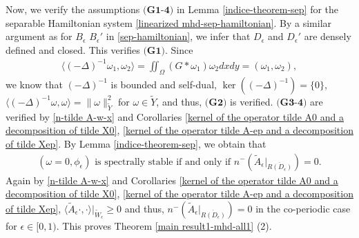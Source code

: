 \documentclass[1 [leqno, 11pt]{amsart}
\numberwithin{equation}{section}
\let\ep=\epsilon
\newtheorem{Theorem}{Theorem}[section]
\begin{document}
\begin{CJK*}{GBK}{song}
Now, we verify the assumptions $\textbf{(G1-4)}$ in Lemma \ref{indice-theorem-sep} for the separable Hamiltonian system
\eqref{linearized mhd-sep-hamiltonian}. By a similar argument as for $B_{\ep}$ $B_{\ep}'$ in
\eqref{sep-hamiltonian}, we infer that $D_\ep$ and $D_\ep'$ are densely defined and closed. This verifies $\textbf{(G1)}$. Since
\begin{align*}
\langle (-\Delta)^{-1}\omega_1,\omega_2\rangle=\iint_{\Omega}(G\ast \omega_1)\omega_2 dxdy=(\omega_1,\omega_2),
\end{align*}
we know that $(-\Delta)^{-1}$ is bounded and self-dual, $\ker((-\Delta)^{-1})=\{0\}$, $\langle(-\Delta)^{-1}\omega,\omega\rangle=\|\omega\|_{\tilde Y}^2$ for $\omega\in\tilde Y$, and thus,  $\textbf{(G2)}$ is verified.
 $\textbf{(G3-4)}$ are verified by \eqref{n-tilde A-w-x} and Corollaries \ref{kernel of  the operator tilde A0 and a decomposition of tilde X0}, \ref{kernel of  the operator tilde A-ep and a decomposition of tilde Xep}.
 By  Lemma \ref{indice-theorem-sep}, we obtain that
 \begin{align}\label{stab-criteria-co-mhd}
 (\omega=0,\phi_{\ep}) \text{ is spectrally stable if and only if } n^-\left(\tilde A_{\ep}|_{\overline{R(D_{\ep})}}\right)=0.
 \end{align}
Again by \eqref{n-tilde A-w-x} and Corollaries \ref{kernel of  the operator tilde A0 and a decomposition of tilde X0}, \ref{kernel of  the operator tilde A-ep and a decomposition of tilde Xep},  $\langle\tilde A_\ep\cdot,\cdot\rangle|_{\tilde W_\ep}\geq0$ and thus, $n^-\left(\tilde A_{\ep}|_{\overline{R(D_{\ep})}}\right)=0$  in the  co-periodic case for $\ep\in[0,1)$. This proves Theorem \ref{main result1-mhd-all1} (2).

\end{CJK*}
\end{document}
